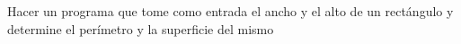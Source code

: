 Hacer un programa que tome como entrada el ancho y el alto de un rectángulo y
determine el perímetro y la superficie del mismo
